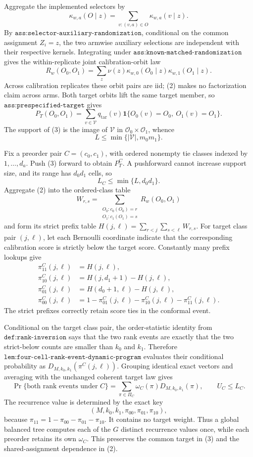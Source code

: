 Aggregate the implemented selectors by
\[
\kappa_{w,a}(O\mid z)=\sum_{v:(v,a)\in O}\kappa_{w,a}(v\mid z).
\tag{1}
\]
By \(\texttt{ass:selector-auxiliary-randomization}\), conditional on the common assignment \(Z_i=z\), the two armwise auxiliary selections are independent with their respective kernels. Integrating under \(\texttt{ass:known-matched-randomization}\) gives the within-replicate joint calibration-orbit law
\[
R_w(O_0,O_1)=\sum_z\nu(z)\kappa_{w,0}(O_0\mid z)\kappa_{w,1}(O_1\mid z).
\tag{2}
\]
Across calibration replicates these orbit pairs are iid; (2) makes no factorization claim across arms. Both target orbits lift the same target member, so \(\texttt{ass:prespecified-target}\) gives
\[
P_T(O_0,O_1)=\sum_{v\in\mathcal V}q_{\mathrm{tar}}(v)\mathbf1\{O_0(v)=O_0,\ O_1(v)=O_1\}.
\tag{3}
\]
The support of (3) is the image of \(\mathcal V\) in \(\mathcal O_0\times\mathcal O_1\), whence
\[
L\le\min\{|\mathcal V|,m_0m_1\}.
\tag{4}
\]

Fix a preorder pair \(C=(c_0,c_1)\), with ordered nonempty tie classes indexed by \(1,\ldots,d_a\). Push (3) forward to obtain \(P_T^C\). A pushforward cannot increase support size, and its range has \(d_0d_1\) cells, so
\[
L_C\le\min\{L,d_0d_1\}.
\tag{5}
\]
Aggregate (2) into the ordered-class table
\[
W_{r,s}=\sum_{\substack{O_0:c_0(O_0)=r\\O_1:c_1(O_1)=s}}R_w(O_0,O_1)
\tag{6}
\]
and form its strict prefix table \(H(j,\ell)=\sum_{r<j}\sum_{s<\ell}W_{r,s}\). For target class pair \((j,\ell)\), let each Bernoulli coordinate indicate that the corresponding calibration score is strictly below the target score. Constantly many prefix lookups give
\[
\begin{aligned}
\pi^C_{11}(j,\ell)&=H(j,\ell),\\
\pi^C_{10}(j,\ell)&=H(j,d_1+1)-H(j,\ell),\\
\pi^C_{01}(j,\ell)&=H(d_0+1,\ell)-H(j,\ell),\\
\pi^C_{00}(j,\ell)&=1-\pi^C_{01}(j,\ell)-\pi^C_{10}(j,\ell)-\pi^C_{11}(j,\ell).
\end{aligned}
\tag{7}
\]
The strict prefixes correctly retain score ties in the conformal event.

Conditional on the target class pair, the order-statistic identity from \(\texttt{def:rank-inversion}\) says that the two rank events are exactly that the two strict-below counts are smaller than \(k_0\) and \(k_1\). Therefore \(\texttt{lem:four-cell-rank-event-dynamic-program}\) evaluates their conditional probability as \(D_{M,k_0,k_1}(\pi^C(j,\ell))\). Grouping identical exact vectors and averaging with the unchanged coherent target law gives
\[
\Pr\{\text{both rank events under }C\}=\sum_{\pi\in\Pi_C}\omega_C(\pi)D_{M,k_0,k_1}(\pi),\qquad U_C\le L_C.
\tag{8}
\]
The recurrence value is determined by the exact key
\[
(M,k_0,k_1,\pi_{00},\pi_{01},\pi_{10}),
\tag{9}
\]
because \(\pi_{11}=1-\pi_{00}-\pi_{01}-\pi_{10}\). It contains no target weight. Thus a global balanced tree computes each of the \(G\) distinct recurrence values once, while each preorder retains its own \(\omega_C\). This preserves the common target in (3) and the shared-assignment dependence in (2).

